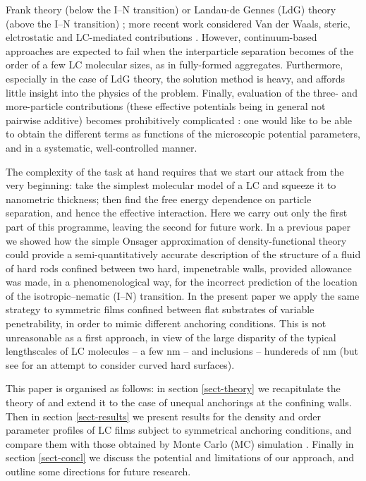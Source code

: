 \documentclass[aps,pre,twocolumn,groupedaddress,showpacs]{revtex4}
\begin{document}
Frank theory (below the I--N transition) \cite{Poulin:1997,Terentjev} 
or Landau-de Gennes (LdG) theory (above the I--N transition) \cite{Galatola}; 
more recent work considered Van der Waals, steric, elctrostatic and 
LC-mediated contributions \cite{Stark:2000}. However, continuum-based 
approaches are expected to fail when the interparticle separation 
becomes of the order of a few LC molecular sizes, as in fully-formed 
aggregates. Furthermore, especially in the case of LdG theory, the solution 
method is heavy, and affords little insight into the physics of the problem. 
Finally, evaluation of the three- and more-particle contributions
(these effective potentials being in general not pairwise additive) 
becomes prohibitively complicated \cite{Galatola}: one would like to 
be able to obtain the different terms as functions of the microscopic 
potential parameters, and in a systematic, well-controlled manner. 
\par
The complexity of the task at hand requires that we start our attack from 
the very beginning: take the simplest molecular model of a LC and squeeze 
it to nanometric thickness; then find the free energy dependence on particle
separation, and hence the effective interaction. Here we carry out only 
the first part of this programme, leaving the second for future work.
In a previous paper \cite{Chrzanowska:2001} we showed how the simple  
Onsager approximation of density-functional theory could provide a 
semi-quantitatively accurate description of the structure of a fluid
of hard rods confined between two hard, impenetrable walls, provided 
allowance was made, in a phenomenological way, for the incorrect  
prediction of the location of the isotropic--nematic (I--N) transition. 
In the present paper we apply the same strategy to symmetric films confined 
between flat substrates of variable penetrability, in order to mimic different 
anchoring conditions. This is not unreasonable as a first approach, 
in view of the large disparity of the typical lengthscales of LC 
molecules -- a few nm -- and inclusions -- hundereds of nm (but 
see \cite{Groh} for an attempt to consider curved hard surfaces).
\par
This paper is organised as follows: in section \ref{sect-theory} we 
recapitulate the theory of \cite{Chrzanowska:2001} and extend it to
the case of unequal anchorings at the confining walls. Then in section 
\ref{sect-results} we present results for the density and order parameter 
profiles of LC films subject to symmetrical anchoring conditions, and 
compare them with those obtained by Monte Carlo (MC) simulation 
\cite{Cleaver:2001,Barmes:2003}. Finally in section \ref{sect-concl} 
we discuss the potential and limitations of our approach, and outline some 
directions for future research. 
\end{document}
